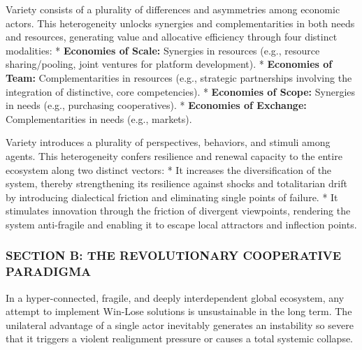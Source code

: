 \documentclass[11pt,a4paper,oneside]{article} %
\begin{document}
\hypertarget{the-economic-foundation-of-variety-as-a-driver-of-value-and-efficiency}{%
\label{the-economic-foundation-of-variety-as-a-driver-of-value-and-efficiency}}

Variety consists of a plurality of differences and asymmetries among
economic actors. This heterogeneity unlocks synergies and
complementarities in both needs and resources, generating value and
allocative efficiency through four distinct modalities: *
\textbf{Economies of Scale:} Synergies in resources (e.g., resource
sharing/pooling, joint ventures for platform development). *
\textbf{Economies of Team:} Complementarities in resources (e.g.,
strategic partnerships involving the integration of distinctive, core
competencies). * \textbf{Economies of Scope:} Synergies in needs (e.g.,
purchasing cooperatives). * \textbf{Economies of Exchange:}
Complementarities in needs (e.g., markets).

\hypertarget{the-ecological-foundation-of-variety-as-a-driver-of-resilience-and-renewal}{%
\label{the-ecological-foundation-of-variety-as-a-driver-of-resilience-and-renewal}}

Variety introduces a plurality of perspectives, behaviors, and stimuli
among agents. This heterogeneity confers resilience and renewal capacity
to the entire ecosystem along two distinct vectors: * It increases the
diversification of the system, thereby strengthening its resilience
against shocks and totalitarian drift by introducing dialectical
friction and eliminating single points of failure. * It stimulates
innovation through the friction of divergent viewpoints, rendering the
system anti-fragile and enabling it to escape local attractors and
inflection points.

\hypertarget{section-b-the-revolutionary-cooperative-paradigma}{%
\subsubsection{SECTION B: THE REVOLUTIONARY COOPERATIVE
PARADIGMA}\label{section-b-the-revolutionary-cooperative-paradigma}}

\hypertarget{the-structural-failure-of-win-lose-models}{%
\label{the-structural-failure-of-win-lose-models}}

In a hyper-connected, fragile, and deeply interdependent global
ecosystem, any attempt to implement Win-Lose solutions is unsustainable
in the long term. The unilateral advantage of a single actor inevitably
generates an instability so severe that it triggers a violent
realignment pressure or causes a total systemic collapse.
\end{document}
